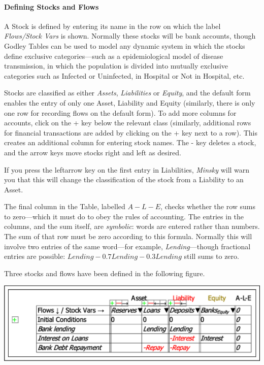 \paragraph{Defining Stocks and Flows}

A Stock is defined by entering its name in the row on which the label
\emph{Flows\textdownarrow /Stock Vars\textrightarrow{}} is shown.
Normally these stocks will be bank accounts, though Godley Tables
can be used to model any dynamic system in which the stocks define
exclusive categories---such as a epidemiological model of disease
transmission, in which the population is divided into mutually exclusive
categories such as Infected or Uninfected, in Hospital or Not in Hospital,
etc.

Stocks are classified as either \emph{Assets}, \emph{Liabilities }or
\emph{Equity}, and the default form enables the entry of only one
Asset, Liability and Equity (similarly, there is only one row for
recording flows on the default form). To add more columns for accounts,
click on the + key below the relevant class (similarly, additional
rows for financial transactions are added by clicking on the + key
next to a row). This creates an additional column for entering stock
names. The - key deletes a stock, and the arrow keys move stocks right
and left as desired. 

If you press the leftarrow key on the first entry in Liabilities,
\emph{Minsky} will warn you that this will change the classification
of the stock from a Liability to an Asset.

The final column in the Table, labelled $A-L-E$, checks whether the
row sums to zero---which it must do to obey the rules of accounting.
The entries in the columns, and the sum itself, are \emph{symbolic}:
words are entered rather than numbers. The sum of that row must be
zero according to this formula. Normally this will involve two entries
of the same word---for example, \emph{Lending}---though fractional
entries are possible: $Lending-0.7Lending-0.3Lending$ still sums
to zero.

Three stocks and flows have been defined in the following figure. 

\includegraphics{images/GodleyTableEditMode3StocksAndFlows}


